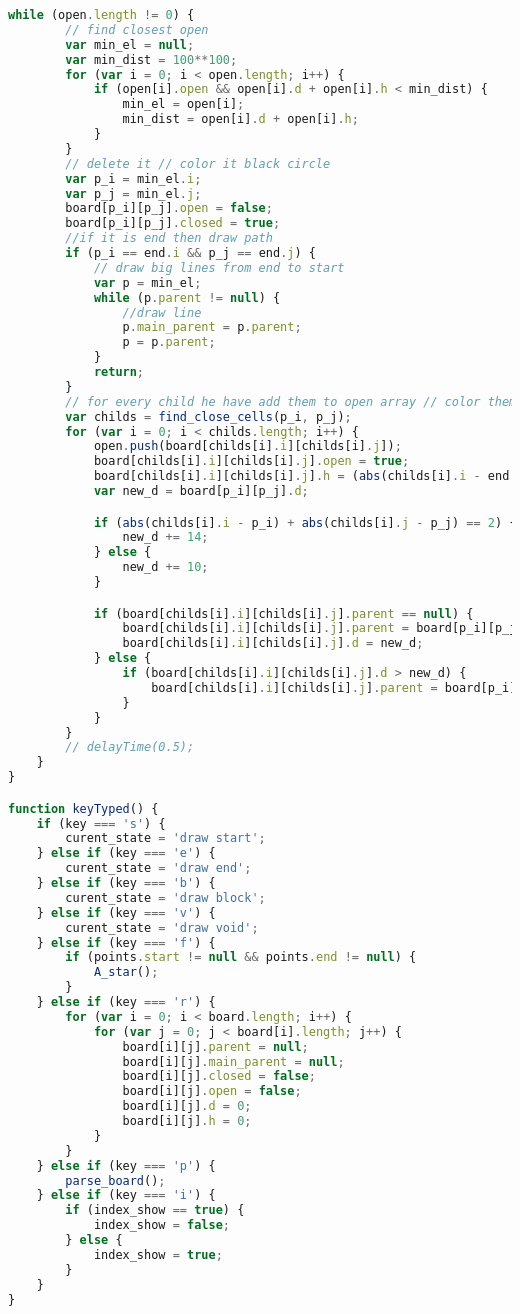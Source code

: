 \begin{lstlisting}[language=Javascript]
	while (open.length != 0) {
		// find closest open
		var min_el = null;
		var min_dist = 100**100;
		for (var i = 0; i < open.length; i++) {
			if (open[i].open && open[i].d + open[i].h < min_dist) {
				min_el = open[i];
				min_dist = open[i].d + open[i].h;
			}
		}
		// delete it // color it black circle
		var p_i = min_el.i;
		var p_j = min_el.j;
		board[p_i][p_j].open = false;
		board[p_i][p_j].closed = true;
		//if it is end then draw path
		if (p_i == end.i && p_j == end.j) {
			// draw big lines from end to start
			var p = min_el;
			while (p.parent != null) {
				//draw line
				p.main_parent = p.parent;
				p = p.parent;
			}
			return;
		}
		// for every child he have add them to open array // color them in blue circle
		var childs = find_close_cells(p_i, p_j);
		for (var i = 0; i < childs.length; i++) {
			open.push(board[childs[i].i][childs[i].j]);
			board[childs[i].i][childs[i].j].open = true;
			board[childs[i].i][childs[i].j].h = (abs(childs[i].i - end.i) + abs(childs[i].j - end.j)) * 10;
			var new_d = board[p_i][p_j].d;

			if (abs(childs[i].i - p_i) + abs(childs[i].j - p_j) == 2) {
				new_d += 14;
			} else {
				new_d += 10;
			}

			if (board[childs[i].i][childs[i].j].parent == null) {
				board[childs[i].i][childs[i].j].parent = board[p_i][p_j];
				board[childs[i].i][childs[i].j].d = new_d;
			} else {
				if (board[childs[i].i][childs[i].j].d > new_d) {
					board[childs[i].i][childs[i].j].parent = board[p_i][p_j];
				}
			}
		}
		// delayTime(0.5);
	}
}

function keyTyped() {
    if (key === 's') {
        curent_state = 'draw start';
    } else if (key === 'e') {
        curent_state = 'draw end';
    } else if (key === 'b') {
        curent_state = 'draw block';
    } else if (key === 'v') {
        curent_state = 'draw void';
    } else if (key === 'f') {
		if (points.start != null && points.end != null) {
			A_star();
		}
    } else if (key === 'r') {
		for (var i = 0; i < board.length; i++) {
			for (var j = 0; j < board[i].length; j++) {
				board[i][j].parent = null;
				board[i][j].main_parent = null;
				board[i][j].closed = false;
				board[i][j].open = false;
				board[i][j].d = 0;
				board[i][j].h = 0;
			}
		}
    } else if (key === 'p') {
		parse_board();
	} else if (key === 'i') {
		if (index_show == true) {
			index_show = false;
		} else {
			index_show = true;
		}
	}
}


\end{lstlisting}
